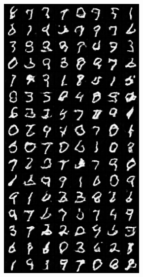 \begin{figure}[H]
    \begin{subfigure}{0.2\textwidth}
        \centering
        \includegraphics[width=0.95\linewidth]{GAN/fake_sample_epoch_0002.png}
        \caption{}
        \label{subfig:GAN/fake_sample_epoch_0002}
    \end{subfigure}%
    \begin{subfigure}{0.2\textwidth}

\end{subfigure}
\end{figure}
